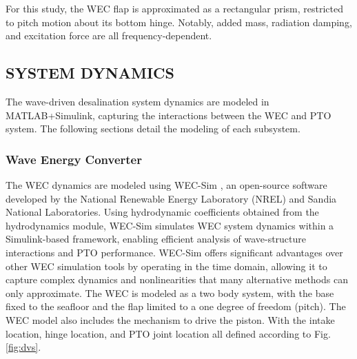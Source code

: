 \documentclass[twocolumn,10pt]{asme2e}
\begin{document}
For this study, the WEC flap is approximated as a rectangular prism, restricted to pitch motion about its bottom hinge. Notably, added mass, radiation damping, and excitation force are all frequency-dependent.


\subsection{SYSTEM DYNAMICS} \label{sec:sysdyn}

The wave-driven desalination system dynamics are modeled in MATLAB+Simulink, capturing the interactions between the WEC and PTO system. The following sections detail the modeling of each subsystem.

\subsubsection{Wave Energy Converter}

The WEC dynamics are modeled using WEC-Sim \cite{wecsim}, an open-source software developed by the National Renewable Energy Laboratory (NREL) and Sandia National Laboratories. Using hydrodynamic coefficients obtained from the hydrodynamics module, WEC-Sim simulates WEC system dynamics within a Simulink-based framework, enabling efficient analysis of wave-structure interactions and PTO performance. WEC-Sim offers significant advantages over other WEC simulation tools by operating in the time domain, allowing it to capture complex dynamics and nonlinearities that many alternative methods can only approximate. The WEC is modeled as a two body system, with the base fixed to the seafloor and the flap limited to a one degree of freedom (pitch). The WEC model also includes the mechanism to drive the piston. With the intake location, hinge location, and PTO joint location all defined according to Fig. \ref{fig:dvs}. 

\end{document}

